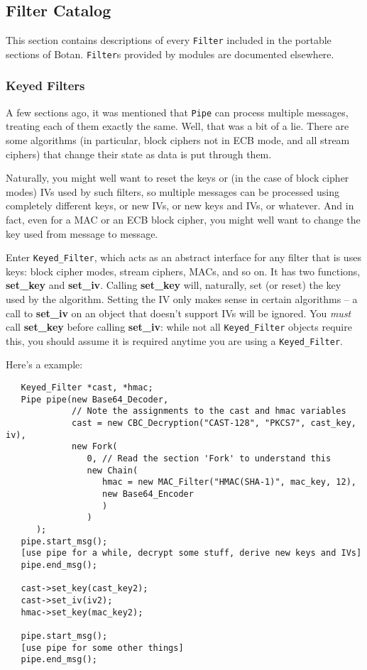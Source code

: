 \documentclass{article}
\newcommand{\function}[1]{\textbf{#1}}
\newcommand{\type}[1]{\texttt{#1}}
\begin{document}
\subsection{Filter Catalog}

This section contains descriptions of every \type{Filter} included in
the portable sections of Botan. \type{Filter}s provided by modules
are documented elsewhere.

\subsubsection{Keyed Filters}

A few sections ago, it was mentioned that \type{Pipe} can process multiple
messages, treating each of them exactly the same. Well, that was a bit of a
lie. There are some algorithms (in particular, block ciphers not in ECB mode,
and all stream ciphers) that change their state as data is put through them.

Naturally, you might well want to reset the keys or (in the case of block
cipher modes) IVs used by such filters, so multiple messages can be processed
using completely different keys, or new IVs, or new keys and IVs, or whatever.
And in fact, even for a MAC or an ECB block cipher, you might well want to
change the key used from message to message.

Enter \type{Keyed\_Filter}, which acts as an abstract interface for
any filter that is uses keys: block cipher modes, stream ciphers,
MACs, and so on. It has two functions, \function{set\_key} and
\function{set\_iv}. Calling \function{set\_key} will, naturally, set
(or reset) the key used by the algorithm. Setting the IV only makes
sense in certain algorithms -- a call to \function{set\_iv} on an
object that doesn't support IVs will be ignored. You \emph{must} call
\function{set\_key} before calling \function{set\_iv}: while not all
\type{Keyed\_Filter} objects require this, you should assume it is
required anytime you are using a \type{Keyed\_Filter}.

Here's a example:

\begin{verbatim}
   Keyed_Filter *cast, *hmac;
   Pipe pipe(new Base64_Decoder,
             // Note the assignments to the cast and hmac variables
             cast = new CBC_Decryption("CAST-128", "PKCS7", cast_key, iv),
             new Fork(
                0, // Read the section 'Fork' to understand this
                new Chain(
                   hmac = new MAC_Filter("HMAC(SHA-1)", mac_key, 12),
                   new Base64_Encoder
                   )
                )
      );
   pipe.start_msg();
   [use pipe for a while, decrypt some stuff, derive new keys and IVs]
   pipe.end_msg();

   cast->set_key(cast_key2);
   cast->set_iv(iv2);
   hmac->set_key(mac_key2);

   pipe.start_msg();
   [use pipe for some other things]
   pipe.end_msg();
\end{verbatim}
\end{document}
